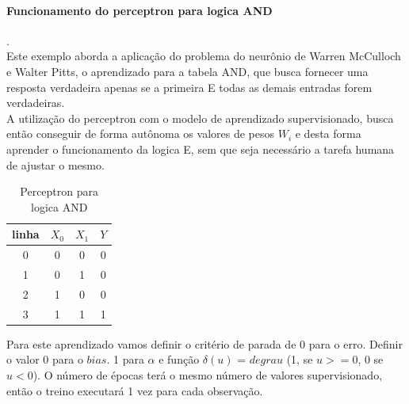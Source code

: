 \documentclass[	12pt, Times, openright, twoside, a4paper, english, brazil]{abntex2}
\begin{document}
        \paragraph*{Funcionamento do perceptron para logica AND}.\\
		 Este exemplo aborda a aplicação do problema do neurônio de Warren McCulloch e Walter Pitts, o aprendizado para a tabela AND, que busca fornecer uma resposta verdadeira apenas se a primeira E todas as demais entradas forem verdadeiras.\\            	
        A utilização do perceptron com o modelo de aprendizado supervisionado, busca então conseguir de forma autônoma os valores de pesos $W_i$ e desta forma aprender o funcionamento da logica E, sem que seja necessário a tarefa humana de ajustar o mesmo.\\
                 \begin{table}[!ht]
                 \centering
                 \caption{Perceptron para logica AND}
  				  \begin{tabular}{|c|c|c|c|}
  				 	\hline  \textbf{linha} & \textbf{$X_0$} & \textbf{$X_1$} &  \textbf{$Y$}\\
  				 	\hline 0 & 0 & 0 & 0\\
  				 	\hline 1 & 0 & 1 & 0\\
  				 	\hline 2 & 1 & 0 & 0\\
  				 	\hline 3 & 1 & 1 & 1\\ \hline
  				  \end{tabular}
                \end{table}
					
  Para este aprendizado vamos definir o critério de parada de 0 para o erro. 
  Definir o valor 0 para o $bias$. 
  1 para $\alpha$ e 
  função $\delta(u)$ = $degrau$ (1, se $u>=0$, 0 se $u<0$).
  O número de épocas terá o mesmo número de valores supervisionado, então o treino executará 1 vez para cada observação.
  			 	   
\end{document}
